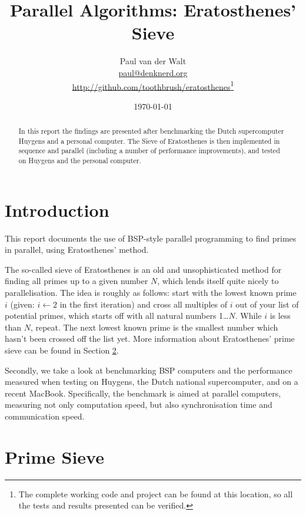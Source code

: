 \documentclass[a4paper]{article}
\author{Paul van der Walt\\\url{paul@denknerd.org}\\\url{http://github.com/toothbrush/eratosthenes}\footnote{The complete
working code and project can be found at this location, so all the tests and
results presented can be verified. }}
\date{\today}
\title{Parallel Algorithms: Eratosthenes' Sieve}
\begin{document}
\maketitle
\begin{quote}
\end{quote}

\begin{abstract}
    In this report the findings are presented after benchmarking the Dutch
    supercomputer Huygens and a personal computer. The Sieve of Eratosthenes is
    then implemented in sequence and parallel (including a number of performance
    improvements), and tested on Huygens and the
    personal computer. 
\end{abstract}
\tableofcontents
\clearpage
\section{Introduction}

This report documents the use of BSP-style\cite{BSP} parallel programming to
find primes in parallel, using Eratosthenes' method. 

The so-called sieve of Eratosthenes is an old and unsophisticated method for
finding all primes up to a given number $N$, which lends itself quite nicely to
parallelisation. The idea is roughly as follows: start with the lowest known
prime $i$ (given: $i \leftarrow 2$ in the first iteration) and cross all
multiples of $i$ out of your list of potential primes, which starts off with all
natural numbers 1\ldots$N$. While $i$ is less than $N$, repeat. The next lowest
known prime is the smallest number which hasn't been crossed off the list yet.
More information about Eratosthenes' prime sieve can be found in Section
\ref{sec:sieve}. 

Secondly, we take a look at benchmarking BSP computers and the performance
measured when testing on Huygens\cite{sarahuygens}, the Dutch national
supercomputer, and on a recent MacBook. Specifically, the benchmark is aimed at
parallel computers, measuring not only computation speed, but also
synchronisation time and communication speed. 



\section{Prime Sieve}\label{sec:sieve}
\end{document}
